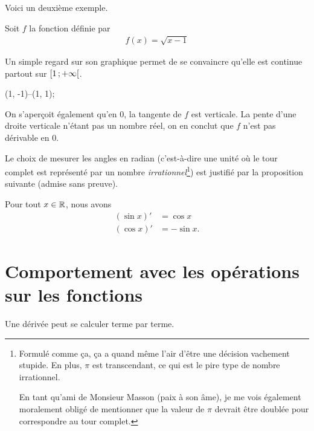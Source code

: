 \documentclass[main.tex]{subfiles}
\begin{document}
Voici un deuxième exemple.

\begin{example}
    
    Soit $f$ la fonction définie par 
    \begin{align}
        f(x) = \sqrt {x-1}
    \end{align}
    
    Un simple regard sur son graphique permet de se convaincre qu'elle est continue partout sur $\mathopen{[}1\,;+ \infty\mathclose{[}$.
    \begin{plot}{0.5}{-2}{-2}{6}{4}
        \drawline (1, -1)--(1, 1);
    \end{plot}
    
    On s'aperçoit également qu'en $0$, la tangente de $f$ est verticale.
    La pente d'une droite verticale n'étant pas un nombre réel, on en conclut que $f$ n'est pas dérivable en $0$.
\end{example}

Le choix de mesurer les angles en radian
(c'est-à-dire une unité où le tour complet est représenté par un nombre \emph{irrationnel}\footnote{%
    Formulé comme ça, ça a quand même l'air d'être une décision vachement stupide.
    En plus, $\pi$ est transcendant, ce qui est le pire type de nombre irrationnel.

    En tant qu'ami de Monsieur Masson (paix à son âme),
    je me vois également moralement obligé de mentionner
    que la valeur de $\pi$ devrait être doublée pour correspondre au tour complet.
})
est justifié par la proposition suivante (admise sans preuve).

\begin{proposition}

    Pour tout $x \in \mathbb{R}$,
    nous avons
    \begin{align}
        (\sin x)' &= \cos x\\
        (\cos x)' &= -\sin x.
    \end{align}
\end{proposition}

\section{Comportement avec les opérations sur les fonctions}

Une dérivée peut se calculer terme par terme.
\end{document}
